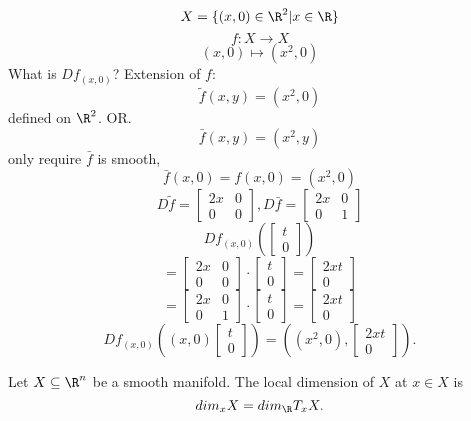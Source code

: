 $$X=\{(x,0)\in \R^2 | x\in \R\}$$
$$f:X\to X$$
$$(x,0)\mapsto (x^2,0)$$
What is $Df_{(x,0)}$? Extension of $f$:
  $$\tilde{f}(x,y)=(x^2,0)$$
  defined on $\R^2$. OR.
  $$\bar{f}(x,y)=(x^2,y)$$
only require $\bar{f}$ is smooth,
  $$\bar{f}(x,0)=f(x,0)=(x^2,0)$$
  $$D\tilde{f}=
  \begin{bmatrix}
    2x & 0 \\
    0 & 0
  \end{bmatrix}
  , D\bar{f}=
  \begin{bmatrix}
    2x & 0 \\
    0 & 1
  \end{bmatrix}
  $$
  $$Df_{(x,0)}\left(
  \begin{bmatrix}
    t \\
    0
  \end{bmatrix}
  \right)
  $$
  $$=
  \begin{bmatrix}
    2x & 0 \\
    0 & 0
  \end{bmatrix} \cdot
  \begin{bmatrix}
    t \\
    0
  \end{bmatrix}
  =
  \begin{bmatrix}
    2xt \\
    0
  \end{bmatrix}
  $$
  $$=
  \begin{bmatrix}
    2x & 0 \\
    0 & 1
  \end{bmatrix} \cdot
  \begin{bmatrix}
    t \\
    0
  \end{bmatrix}
  =
  \begin{bmatrix}
    2xt \\
    0
  \end{bmatrix}
  $$
  $$
  Df_{(x,0)}\left((x,0)
  \begin{bmatrix}
    t \\
    0
  \end{bmatrix}  \right)=\left((x^2,0),
  \begin{bmatrix}
    2xt \\
    0
  \end{bmatrix}
  \right)
  .$$
\begin{definition}
    Let $X \subseteq \R^n $ be a smooth manifold. The local dimension of $X$ at $x\in X$ is
      $$dim_xX=dim_{\R}T_xX.$$
\end{definition}

